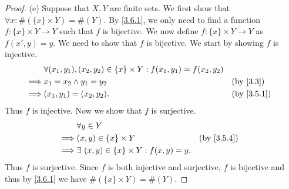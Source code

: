 \begin{proof}{(e)}
  Suppose that \(X, Y\) are finite sets.
  We first show that \(\forall x : \#(\{x\} \times Y) = \#(Y)\).
  By \cref{3.6.1}, we only need to find a function \(f : \{x\} \times Y \to Y\) such that \(f\) is bijective.
  We now define \(f : \{x\} \times Y \to Y\) as \(f(x', y) = y\).
  We need to show that \(f\) is bijective.
  We start by showing \(f\) is injective.
  \begin{align*}
             & \forall (x_1, y_1), (x_2, y_2) \in \{x\} \times Y : f(x_1, y_1) = f(x_2, y_2)                               \\
    \implies & x_1 = x_2 \land y_1 = y_2                                                     &  & \text{(by \cref{3.3})}   \\
    \implies & (x_1, y_1) = (x_2, y_2).                                                      &  & \text{(by \cref{3.5.1})}
  \end{align*}
  Thus \(f\) is injective.
  Now we show that \(f\) is surjective.
  \begin{align*}
             & \forall y \in Y                                                                 \\
    \implies & (x, y) \in \{x\} \times Y                         &  & \text{(by \cref{3.5.4})} \\
    \implies & \exists\ (x, y) \in \{x\} \times Y : f(x, y) = y.
  \end{align*}
  Thus \(f\) is surjective.
  Since \(f\) is both injective and surjective, \(f\) is bijective and thus by \cref{3.6.1} we have \(\#(\{x\} \times Y) = \#(Y)\).


\end{proof}
